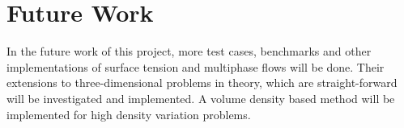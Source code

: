 \documentclass[oneside]{iitbreport}
\begin{document}
\chapter{Future Work}

In the future work of this project, more test cases, benchmarks and other implementations of surface tension and multiphase flows will be done. Their extensions to three-dimensional problems in theory, which are straight-forward will be investigated and implemented. A volume density based method will be implemented for high density variation problems.


     

%             



\end{document}
